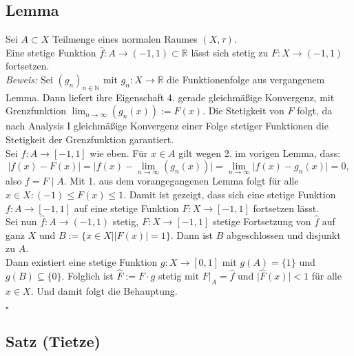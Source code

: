 \documentclass[11pt,leqno]{article}
\newcommand{\R}{\mathbb{R}}
\newcommand{\N}{\mathbb{N}}
\begin{document}
\subsection{Lemma}
Sei $A \subset X$ Teilmenge eines normalen Raumes $(X,\tau)$. \\
Eine stetige Funktion $\hat{f}: A \rightarrow (-1,1) \subset \R$ lässt sich stetig zu
$F:X \rightarrow (-1,1)$ fortsetzen. \\
\textit{Beweis:} Sei $(g_n)_{n\in\N}$ mit $g_n:X\rightarrow \R$ die Funktionenfolge aus vergangenem Lemma. Dann liefert ihre Eigenschaft 4. gerade
gleichmäßige Konvergenz, mit Grenzfunktion $\lim_{n\rightarrow\infty}(g_n(x)) := F(x)$. Die Stetigkeit von $F$ folgt, da nach Analysis I
gleichmäßige Konvergenz einer Folge stetiger Funktionen die Stetigkeit der Grenzfunktion garantiert. \\
Sei $f:A \rightarrow [-1,1]$ wie eben. Für $x \in A$ gilt wegen 2. im vorigen Lemma, dass:
\[ \big\vert f(x)-F(x)\big\vert = \big\vert f(x)-\lim_{n\rightarrow\infty}(g_n(x))\big\vert = \lim_{n\rightarrow\infty}\big\vert f(x)-g_n(x)\big\vert=0,\]
also $f=F\mid A$. Mit 1. aus dem vorangegangenen Lemma folgt für alle $x \in X: (-1)\leq F(x) \leq 1$. Damit ist gezeigt, dass sich eine stetige Funktion
$f:A \rightarrow [-1,1]$ auf eine stetige Funktion $F:X \rightarrow [-1,1]$ fortsetzen lässt. \\
Sei nun $\hat{f}:A \rightarrow (-1,1)$ stetig, $F:X \rightarrow [-1,1]$ stetige Fortsetzung von $\hat{f}$ auf ganz $X$ und 
$B:=\{x \in X \mid \vert F(x) \vert = 1\}$. Dann ist $B$ abgeschlossen und disjunkt zu $A$. \\
Dann existiert eine stetige Funktion $g:X \rightarrow [0,1]$ mit $g(A)=\{1\}$ und $g(B)\subseteq\{0\}$.
Folglich ist $\hat{F}:=F\cdot g$ stetig mit $F\big\vert_A = \hat{f}$ und $\vert \hat{F}(x)\vert < 1$ für alle $x \in X$.
Und damit folgt die Behauptung.
\begin{flushright}
    $\square$
\end{flushright}

\subsection{Satz (Tietze)}
\end{document}
